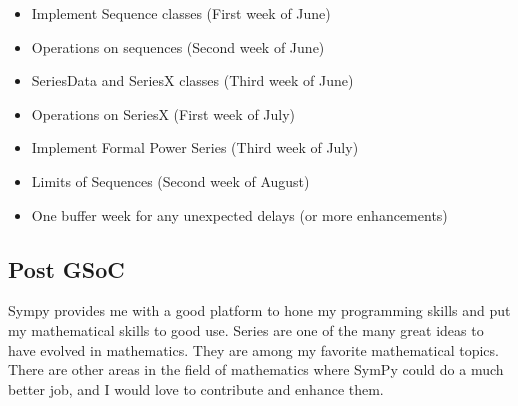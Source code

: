 \documentclass[a4paper,12pt]{article}
\begin{document}
\begin{itemize}
  \item Implement Sequence classes (First week of June)
  \item Operations on sequences (Second week of June)
  \item SeriesData and SeriesX classes (Third week of June)
  \item Operations on SeriesX (First week of July)
  \item Implement Formal Power Series (Third week of July)
  \item Limits of Sequences (Second week of August)
  \item One buffer week for any unexpected delays (or more enhancements)
\end{itemize}

\subsection{Post GSoC}
Sympy provides me with a good platform to hone my programming skills and put my mathematical skills to good use.
Series are one of the many great ideas to have evolved in mathematics. They are among my favorite mathematical topics. There are other areas in the field of mathematics where SymPy could do a much better job, and I would love to contribute and enhance them.
\end{document}
